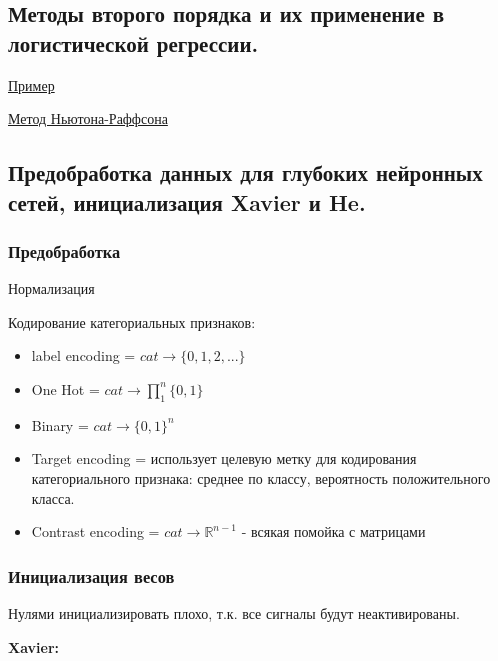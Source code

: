 \documentclass{article}
\begin{document}
\subsection{Методы второго порядка и их применение в логистической регрессии.}

\href{http://www.machinelearning.ru/wiki/index.php?title=%D0%9B%D0%BE%D0%B3%D0%B8%D1%81%D1%82%D0%B8%D1%87%D0%B5%D1%81%D0%BA%D0%B0%D1%8F_%D1%80%D0%B5%D0%B3%D1%80%D0%B5%D1%81%D1%81%D0%B8%D1%8F_%28%D0%BF%D1%80%D0%B8%D0%BC%D0%B5%D1%80%29}{Пример}

\href{http://www.machinelearning.ru/wiki/index.php?title=%D0%9C%D0%B5%D1%82%D0%BE%D0%B4_%D0%BA%D0%B0%D1%81%D0%B0%D1%82%D0%B5%D0%BB%D1%8C%D0%BD%D1%8B%D1%85_%28%D0%9D%D1%8C%D1%8E%D1%82%D0%BE%D0%BD%D0%B0-%D0%A0%D0%B0%D1%84%D1%81%D0%BE%D0%BD%D0%B0%29}{Метод Ньютона-Раффсона}

\subsection{Предобработка данных для глубоких нейронных сетей, инициализация Xavier и
He.}

\subsubsection{Предобработка}

Нормализация

Кодирование категориальных признаков:
\begin{itemize}
	\item label encoding = $cat \to \{0, 1, 2, ...\}$
	\item One Hot = $cat \to \prod\limits_1^n \{0, 1\}$
	\item Binary = $cat \to \{0, 1\}^n$
	\item Target encoding = использует целевую метку для кодирования
	категориального признака: среднее по классу, вероятность положительного
	класса.
	\item Contrast encoding = $cat \to \mathbb{R}^{n-1}$ - всякая помойка
	с матрицами
\end{itemize}

\subsubsection{Инициализация весов}

Нулями инициализировать плохо, т.к. все сигналы будут неактивированы.

\textbf{Xavier:}
\end{document}
